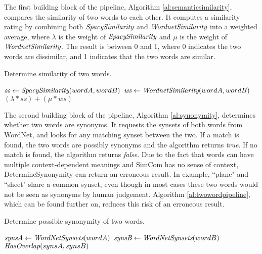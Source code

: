 \documentclass{article}
\begin{document}
The first building block of the pipeline, Algorithm \ref{al:semanticsimilarity}, compares the similarity of two words to each other. It computes a similarity rating by combining both $\emph{SpacySimilarity}$ and $\emph{WordnetSimilarity}$ into a weighted average, where $\lambda$ is the weight of $\emph{SpacySimilarity}$ and $\mu$ is the weight of $\emph{WordnetSimilarity}$. The result is between 0 and 1, where 0 indicates the two words are dissimilar, and 1 indicates that the two words are similar.

\begin{algorithm}
\caption{Determine similarity of two words.}\label{al:semanticsimilarity}
\begin{algorithmic}[1]
		\State $\emph{ss} \gets \emph{SpacySimilarity}(wordA, wordB)$
		\State $\emph{ws} \gets \emph{WordnetSimilarity}(wordA, wordB)$
		\State \Return $(\lambda*ss)+(\mu*ws)$
	\EndProcedure
\end{algorithmic}
\end{algorithm}

The second building block of the pipeline, Algorithm \ref{al:synonymity}, determines whether two words are synonyms. It requests the synsets of both words from WordNet, and looks for any matching synset between the two. If a match is found, the two words are possibly synonyms and the algorithm returns \emph{true}. If no match is found, the algorithm returns \emph{false}. Due to the fact that words can have multiple context-dependent meanings and SimCom has no sense of context, DetermineSynonymity can return an erroneous result. In example, ``plane" and ``sheet" share a common synset, even though in most cases these two words would not be seen as synonyms by human judgement. Algorithm \ref{al:twowordpipeline}, which can be found further on, reduces this risk of an erroneous result.

\begin{algorithm}
\caption{Determine possible synonymity of two words.}\label{al:synonymity}
\begin{algorithmic}[1]
		\State $\emph{synsA} \gets \emph{WordNetSynsets}(wordA)$
		\State $\emph{synsB} \gets \emph{WordNetSynsets}(wordB)$
		\State \Return $\emph{HasOverlap}(synsA, synsB)$
	\EndProcedure
\end{algorithmic}
\end{algorithm}
\end{document}

